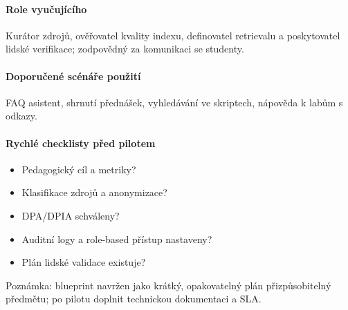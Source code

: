 \paragraph{Role vyučujícího} Kurátor zdrojů, ověřovatel kvality indexu, definovatel retrievalu a poskytovatel lidské verifikace; zodpovědný za komunikaci se studenty.

\paragraph{Doporučené scénáře použití} FAQ asistent, shrnutí přednášek, vyhledávání ve skriptech, nápověda k labům s odkazy.

\paragraph{Rychlé checklisty před pilotem} \begin{itemize}
  \item Pedagogický cíl a metriky? \underline{\hspace{4cm}} \item Klasifikace zdrojů a anonymizace? \underline{\hspace{3cm}}
  \item DPA/DPIA schváleny? \underline{\hspace{3cm}} \item Auditní logy a role‑based přístup nastaveny? \underline{\hspace{3cm}}
  \item Plán lidské validace existuje? \underline{\hspace{3cm}}
\end{itemize}

\noindent Poznámka: blueprint navržen jako krátký, opakovatelný plán přizpůsobitelný předmětu; po pilotu doplnit technickou dokumentaci a SLA.